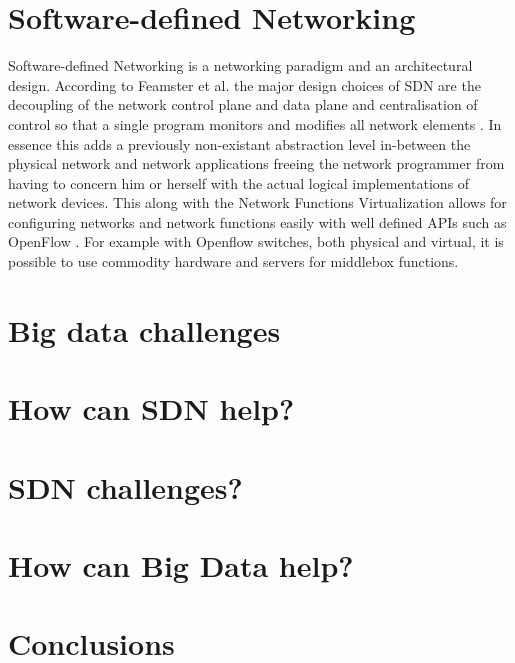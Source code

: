 \documentclass{acm_proc_article-sp}
\begin{document}
\section{Software-defined Networking}

Software-defined Networking is a networking paradigm and an architectural design. According to Feamster et al. the major design choices of SDN are the decoupling of the network control plane and data plane and centralisation of control so that a single program monitors and modifies all network elements \cite{Feamster:2013:RS:2559899.2560327}. In essence this adds a previously non-existant abstraction level in-between the physical network and network applications freeing the network programmer from having to concern him or herself with the actual logical implementations of network devices. This along with the Network Functions Virtualization allows for configuring networks and network functions easily with well defined APIs such as OpenFlow \cite{McKeown-CCR2008}. For example with Openflow switches, both physical and virtual, it is possible to use commodity hardware and servers for middlebox functions. 

\section{Big data challenges}
\section{How can SDN help?}
\section{SDN challenges?}
\section{How can Big Data help?}
\section{Conclusions}



\end{document}
